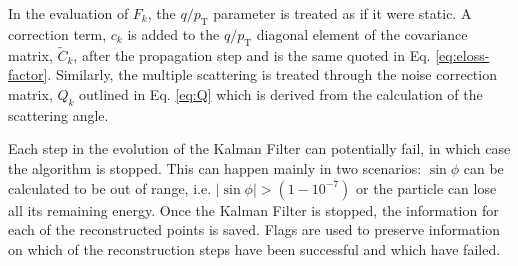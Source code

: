 In the evaluation of $F_k$, the $q/p_{\text{T}}$ parameter is treated as if it were static. A correction term, $c_k$ is added to the $q/p_{\text{T}}$ diagonal element of the covariance matrix, $\widetilde{C}_k$, after the propagation step and is the same quoted in Eq. \ref{eq:eloss-factor}. Similarly, the multiple scattering is treated through the noise correction matrix, $Q_k$ outlined in Eq. \ref{eq:Q} which is derived from the calculation of the scattering angle. 


Each step in the evolution of the Kalman Filter can potentially fail, in which case the algorithm is stopped. This can happen mainly in two scenarios: $\sin \phi$ can be calculated to be out of range, i.e. $|\sin \phi|>(1-10^{-7})$ or the particle can lose all its remaining energy. Once the Kalman Filter is stopped, the information for each of the reconstructed points is saved. Flags are used to preserve information on which of the reconstruction steps have been successful and which have failed. 

